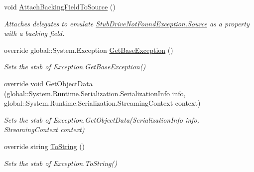 \begin{DoxyCompactItemize}
void \hyperlink{class_system_1_1_i_o_1_1_fakes_1_1_stub_drive_not_found_exception_aa19d954e43a04f3079b0e3574114d847}{Attach\-Backing\-Field\-To\-Source} ()
\begin{DoxyCompactList}\small\item\em Attaches delegates to emulate \hyperlink{class_system_1_1_i_o_1_1_fakes_1_1_stub_drive_not_found_exception_a8d134df9ed9d8f6f4f2a532fd50ee953}{Stub\-Drive\-Not\-Found\-Exception.\-Source} as a property with a backing field.\end{DoxyCompactList}\item 
override global\-::\-System.\-Exception \hyperlink{class_system_1_1_i_o_1_1_fakes_1_1_stub_drive_not_found_exception_a29ff1807dee89276e27cc48be11946e6}{Get\-Base\-Exception} ()
\begin{DoxyCompactList}\small\item\em Sets the stub of Exception.\-Get\-Base\-Exception()\end{DoxyCompactList}\item 
override void \hyperlink{class_system_1_1_i_o_1_1_fakes_1_1_stub_drive_not_found_exception_a128bfabd936952def831764e6b8b0137}{Get\-Object\-Data} (global\-::\-System.\-Runtime.\-Serialization.\-Serialization\-Info info, global\-::\-System.\-Runtime.\-Serialization.\-Streaming\-Context context)
\begin{DoxyCompactList}\small\item\em Sets the stub of Exception.\-Get\-Object\-Data(\-Serialization\-Info info, Streaming\-Context context)\end{DoxyCompactList}\item 
override string \hyperlink{class_system_1_1_i_o_1_1_fakes_1_1_stub_drive_not_found_exception_a17050950d273550030f267658670b7db}{To\-String} ()
\begin{DoxyCompactList}\small\item\em Sets the stub of Exception.\-To\-String()\end{DoxyCompactList}\end{DoxyCompactItemize}
